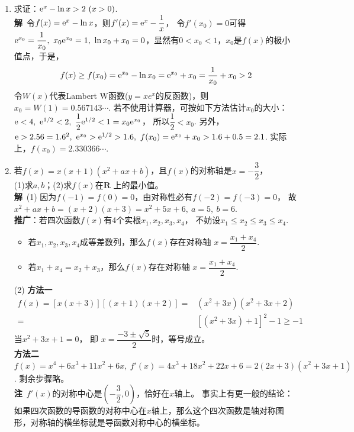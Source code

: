 \begin{enumerate}[label={【\textbf{例\thechapter.\arabic*}】},
 leftmargin=\inteval{\myenumleftmargin}pt,
 itemsep=\inteval{\myenumitempsep}pt,
 itemindent=\inteval{\myenumitemindent}pt]
\item 求证：$ \e^x-\ln x>2\ (x>0) $. \\
\textbf{解}\ 令$ f(x)=\mathrm{e}^x-\ln x $，则$ f'(x)=\mathrm{e}^x-\dfrac{1}{x} $，
令$ f'(x_0)=0 $可得$ \e^{x_0}=\dfrac{1}{x_0},\ x_0\e^{x_0}=1,\ 
\ln x_0+x_0=0 $，显然有$ 0<x_0<1 $，$ x_0 $是$ f(x) $的极小值点，于是，
\begin{align*}
    f(x)\geq f(x_0)=\mathrm{e}^{x_0}-\ln x_0=\mathrm{e}^{x_0}+x_0=\dfrac{1}{x_0}+x_0>2
\end{align*}
令$ W(x) $代表Lambert W函数($ y=xe^x $的反函数)，则$ x_0=W(1)=0.567143\cdots $.
若不使用计算器，可按如下方法估计$ x_0 $的大小：
$ \e<4 ,\ \e^{1/2}< 2,\ \dfrac{1}{2}\e^{1/2} <1=x_0\e^{x_0} $，
所以$ \dfrac{1}{2}<x_0 $. 另外，
$ \e>2.56=1.6^2,\ \e^{x_0}>\e^{1/2}>1.6,\ f(x_0)=\e^{x_0}+x_0
>1.6+0.5=2.1 $. 实际上，$ f(x_0)=2.330366\cdots $. 

\item 若$ f(x)=x(x+1)(x^2+ax+b) $，且$ f(x) $的对称轴是$ x=
-\dfrac{3}{2} $，\\ (1)求$ a,b $；\quad (2)求$ f(x) $在$ \textbf{R} $
上的最小值。\\
\textbf{解}\ (1) 因为$ f(-1)=f(0)=0 $，由对称性必有$ f(-2)=f(-3)=0 $，
故$ x^2+ax+b=(x+2)(x+3)=x^2+5x+6,\ a=5,\ b=6 $. \\
\textbf{推广}：若四次函数$ f(x) $有4个实根$ x_1,x_2,x_3,x_4 $，
不妨设$ x_1\leq x_2\leq x_3\leq x_4 $. 
\begin{itemize}[itemsep=-1pt]
    \item 若$ x_1,x_2,x_3,x_4 $成等差数列，那么$ f(x) $存在对称轴
    $ x=\dfrac{x_1+x_4}{2} $. 
    \item 若$ x_1+x_4=x_2+x_3 $，那么$ f(x) $存在对称轴
    $ x=\dfrac{x_1+x_4}{2} $. 
\end{itemize}
(2) \textbf{方法一}
\begin{align*}
    f(x)=[x(x+3)][(x+1)(x+2)]=&(x^2+3x)(x^2+3x+2) \\
    =&[(x^2+3x)+1]^2-1 \geq -1
\end{align*}
当$ x^2 + 3x + 1=0 $， 即 $ x=\dfrac{-3\pm\sqrt{5}}{2} $时，等号成立。\\
\textbf{方法二}\ $ f(x)=x^4 + 6x^3 + 11x^2 + 6x,\ f'(x)=4x^3+18x^2+22x+6=
2(2x + 3)(x^2 + 3x + 1) $. 剩余步骤略。\\
\textbf{注}\ $ f'(x) $的对称中心是$ (-\dfrac{3}{2},0) $，恰好在$ x $轴上。
事实上有更一般的结论：如果四次函数的导函数的对称中心在$ x $轴上，那么这个四次函数是轴对称图形，对称轴的横坐标就是导函数对称中心的横坐标。


\end{enumerate}
